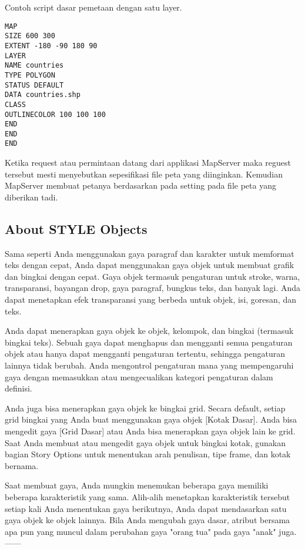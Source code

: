 Contoh script dasar pemetaan dengan satu layer.
\begin{verbatim}
MAP
SIZE 600 300
EXTENT -180 -90 180 90
LAYER
NAME countries
TYPE POLYGON
STATUS DEFAULT
DATA countries.shp
CLASS
OUTLINECOLOR 100 100 100
END
END
END
\end{verbatim}

Ketika request atau permintaan datang dari applikasi MapServer maka reguest tersebut mesti menyebutkan sepesifikasi 
file peta yang diinginkan. Kemudian MapServer membuat petanya berdasarkan pada setting pada file peta yang diberikan tadi.

\subsection{About STYLE Objects}
Sama seperti Anda menggunakan gaya paragraf dan karakter untuk memformat teks dengan cepat, Anda dapat menggunakan gaya objek untuk membuat grafik dan bingkai dengan cepat. Gaya objek termasuk pengaturan untuk stroke, warna, transparansi, bayangan drop, gaya paragraf, bungkus teks, dan banyak lagi. Anda dapat menetapkan efek transparansi yang berbeda untuk objek, isi, goresan, dan teks.

Anda dapat menerapkan gaya objek ke objek, kelompok, dan bingkai (termasuk bingkai teks). Sebuah gaya dapat menghapus dan mengganti semua pengaturan objek atau hanya dapat mengganti pengaturan tertentu, sehingga pengaturan lainnya tidak berubah. Anda mengontrol pengaturan mana yang mempengaruhi gaya dengan memasukkan atau mengecualikan kategori pengaturan dalam definisi.

Anda juga bisa menerapkan gaya objek ke bingkai grid. Secara default, setiap grid bingkai yang Anda buat menggunakan gaya objek [Kotak Dasar]. Anda bisa mengedit gaya [Grid Dasar] atau Anda bisa menerapkan gaya objek lain ke grid. Saat Anda membuat atau mengedit gaya objek untuk bingkai kotak, gunakan bagian Story Options untuk menentukan arah penulisan, tipe frame, dan kotak bernama.

Saat membuat gaya, Anda mungkin menemukan beberapa gaya memiliki beberapa karakteristik yang sama. Alih-alih menetapkan karakteristik tersebut setiap kali Anda menentukan gaya berikutnya, Anda dapat mendasarkan satu gaya objek ke objek lainnya. Bila Anda mengubah gaya dasar, atribut bersama apa pun yang muncul dalam perubahan gaya "orang tua" pada gaya "anak" juga.
------
